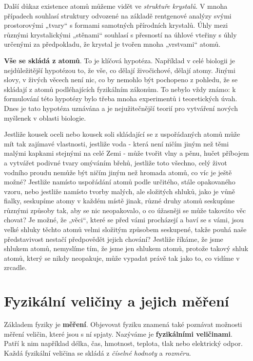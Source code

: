     Další důkaz existence atomů můžeme vidět ve \emph{struktuře krystalů}. V mnoha případech
    souhlasí struktury odvozené na základě rentgenové analýzy svými prostorovými „tvary“ s formami
    samotných přírodních krystalů. Úhly mezi různými krystalickými „stěnami“ souhlasí s přesností na
    úhlové vteřiny s úhly určenými za předpokladu, že krystal je tvořen mnoha „vrstvami“ atomů.
    
    \textbf{Vše se skládá z atomů}. To je klíčová hypotéza. Například v celé biologii je
    nejdůležitější hypotézou to, že vše, co dělají živočichové, dělají atomy. Jinými slovy, v živých
    věcech není nic, co by nemohlo být pochopeno z pohledu, že se skládají z atomů podléhajících
    fyzikálním zákonům. To nebylo vždy známo: k formulování této hypotézy bylo třeba mnoha
    experimentů i teoretických úvah. Dnes je tato hypotéza uznávána a je nejužitečnější teorií pro
    vytváření nových myšlenek v oblasti biologie.
    
    Jestliže kousek oceli nebo kousek soli skládající se z uspořádaných atomů může mít tak zajímavé
    vlastnosti, jestliže voda - která není ničím jiným než těmi malými kapkami stejnými na celé Zemi
    - může tvořit vlny a pěnu, hučet příbojem a vytvářet podivné tvary omýváním břehů, jestliže toto
    všechno, celý život vodního proudu nemůže být ničím jiným než hromada atomů, co víc je ještě
    možné? Jestliže namísto uspořádání atomů podle určitého, stále opakovaného vzoru, nebo jestliže
    namísto tvorby malých, ale složitých shluků, jako je vůně fialky, seskupíme atomy v každém místě
    jinak, různé druhy atomů seskupíme různými způsoby tak, aby se nic neopakovalo, o co úžasněji se
    může takováto věc chovat? Je možné, že „věci“, které se před vámi procházejí a baví se s vámi,
    jsou velké shluky těchto atomů velmi složitým způsobem seskupené, takže pouhá naše představivost
    nestačí předpovědět jejich chování? Jestliže říkáme, že jsme shlukem atomů, nemyslíme tím, že
    jsme jen shlukem atomů, protože takový shluk atomů, který se nikdy neopakuje, může vypadat právě
    tak jako to, co vidíme v zrcadle.

  \section{Fyzikální veličiny a jejich měření}\label{fyz:IchapIsecIX}  
    Základem fyziky je \textbf{měření}. Objevovat fyziku znamená také poznávat možnosti měření
    veličin, které jsou s ní spjaty. Nazýváme je \textbf{fyzikálními veličinami}. Patří k nim
    například délka, čas, hmotnost, teplota, tlak nebo elektrický odpor. Každá fyzikální veličina se
    skládá z \emph{číselné hodnoty} a \emph{rozměru}. 
    
